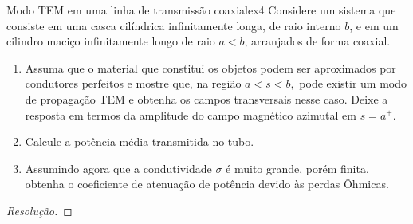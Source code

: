 \begin{exercício}{Modo TEM em uma linha de transmissão coaxial}{ex4}
    Considere um sistema que consiste em uma casca cilíndrica infinitamente longa, de raio interno \(b\), e em um cilindro maciço infinitamente longo de raio \(a < b\), arranjados de forma coaxial.
    \begin{enumerate}[label=(\alph*)]
        \item Assuma que o material que constitui os objetos podem ser aproximados por condutores perfeitos e mostre que, na região \(a < s < b,\) pode existir um modo de propagação TEM e obtenha os campos transversais nesse caso. Deixe a resposta em termos da amplitude do campo magnético azimutal em \(s = a^+\).
        \item Calcule a potência média transmitida no tubo.
        \item Assumindo agora que a condutividade \(\sigma\) é muito grande, porém finita, obtenha o coeficiente de atenuação de potência devido às perdas Ôhmicas.
    \end{enumerate}
\end{exercício}
\begin{proof}[Resolução]
    
\end{proof}
